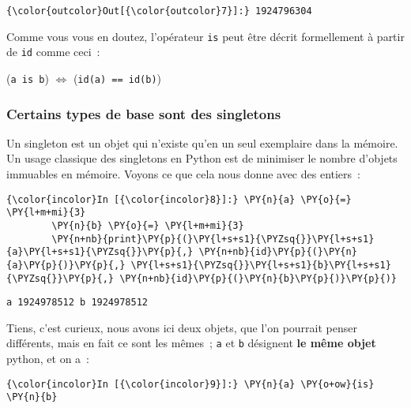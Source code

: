 \begin{Verbatim}[commandchars=\\\{\}]
{\color{outcolor}Out[{\color{outcolor}7}]:} 1924796304
\end{Verbatim}
            
    Comme vous vous en doutez, l'opérateur \texttt{is} peut être décrit
formellement à partir de \texttt{id} comme ceci~:

(\texttt{a\ is\ b}) \(\Longleftrightarrow\) (\texttt{id(a)\ ==\ id(b)})

    \hypertarget{certains-types-de-base-sont-des-singletons}{%
\subsubsection{Certains types de base sont des
singletons}\label{certains-types-de-base-sont-des-singletons}}

    Un singleton est un objet qui n'existe qu'en un seul exemplaire dans la
mémoire. Un usage classique des singletons en Python est de minimiser le
nombre d'objets immuables en mémoire. Voyons ce que cela nous donne avec
des entiers~:

    \begin{Verbatim}[commandchars=\\\{\}]
{\color{incolor}In [{\color{incolor}8}]:} \PY{n}{a} \PY{o}{=} \PY{l+m+mi}{3}
        \PY{n}{b} \PY{o}{=} \PY{l+m+mi}{3}
        \PY{n+nb}{print}\PY{p}{(}\PY{l+s+s1}{\PYZsq{}}\PY{l+s+s1}{a}\PY{l+s+s1}{\PYZsq{}}\PY{p}{,} \PY{n+nb}{id}\PY{p}{(}\PY{n}{a}\PY{p}{)}\PY{p}{,} \PY{l+s+s1}{\PYZsq{}}\PY{l+s+s1}{b}\PY{l+s+s1}{\PYZsq{}}\PY{p}{,} \PY{n+nb}{id}\PY{p}{(}\PY{n}{b}\PY{p}{)}\PY{p}{)}
\end{Verbatim}


    \begin{Verbatim}[commandchars=\\\{\}]
a 1924978512 b 1924978512

    \end{Verbatim}

    Tiens, c'est curieux, nous avons ici deux objets, que l'on pourrait
penser différents, mais en fait ce sont les mêmes~; \texttt{a} et
\texttt{b} désignent \textbf{le même objet} python, et on a~:

    \begin{Verbatim}[commandchars=\\\{\}]
{\color{incolor}In [{\color{incolor}9}]:} \PY{n}{a} \PY{o+ow}{is} \PY{n}{b}
\end{Verbatim}


